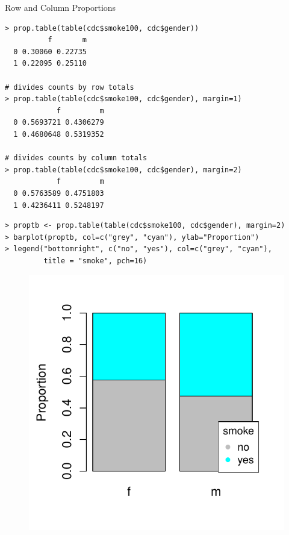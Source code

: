 \documentclass[10pt]{beamer}
\begin{document}
\begin{frame}[fragile]{Row and Column Proportions}
\begin{verbatim}
> prop.table(table(cdc$smoke100, cdc$gender))
          f       m
  0 0.30060 0.22735
  1 0.22095 0.25110 

# divides counts by row totals  
> prop.table(table(cdc$smoke100, cdc$gender), margin=1)  
            f         m
  0 0.5693721 0.4306279
  1 0.4680648 0.5319352
  
# divides counts by column totals  
> prop.table(table(cdc$smoke100, cdc$gender), margin=2) 
            f         m
  0 0.5763589 0.4751803
  1 0.4236411 0.5248197
\end{verbatim}
\end{frame}

\begin{frame}[fragile]
\small
\begin{verbatim}
> proptb <- prop.table(table(cdc$smoke100, cdc$gender), margin=2)
> barplot(proptb, col=c("grey", "cyan"), ylab="Proportion")
> legend("bottomright", c("no", "yes"), col=c("grey", "cyan"), 
         title = "smoke", pch=16)
\end{verbatim}
\begin{figure}[htbp]
\centering
\includegraphics[scale=0.5]{figure/barplot_smokegen_prop.pdf}
\end{figure}
\end{frame}
\end{document}
